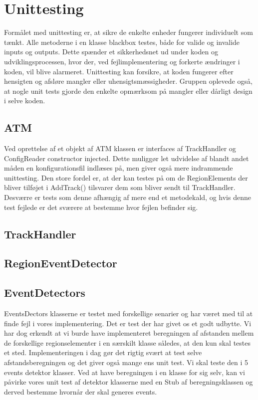 \section{Unittesting}
Formålet med unittesting er, at sikre de enkelte enheder fungerer individuelt som tænkt. Alle metoderne i en klasse blackbox testes, både for valide og invalide inputs og outputs. Dette spænder et sikkerhedsnet ud under koden og udviklingsprocessen, hvor der, ved fejlimplementering og forkerte ændringer i koden, vil blive alarmeret. Unittesting kan forsikre, at koden fungerer efter hensigten og afsløre mangler eller uhensigtsmæssigheder. Gruppen oplevede også, at nogle unit tests gjorde den enkelte opmærksom på mangler eller dårligt design i selve koden.

\subsection{ATM}
Ved oprettelse af et objekt af ATM klassen er interfaces af TrackHandler og ConfigReader constructor injected. Dette muliggør let udvidelse af blandt andet måden en konfigurationsfil indlæses på, men giver også mere indrammende unittesting. Den store fordel er, at der kan testes på om de RegionElements der bliver tilføjet i AddTrack() tilsvarer dem som bliver sendt til TrackHandler. Desværre er tests som denne afhængig af mere end et metodekald, og hvis denne test fejlede er det sværere at bestemme hvor fejlen befinder sig.

\subsection{TrackHandler}

\subsection{RegionEventDetector}
\subsection{EventDetectors}
EventsDectors klasserne er testet med forskellige senarier og har været med til at finde fejl i vores implementering. Det er test der har givet os et godt udbytte. Vi har dog erkendt at vi burde have implementeret beregningen af afstanden mellem de forskellige regionselementer i en særskilt klasse således, at den kun skal testes et sted. Implementeringen i dag gør det rigtig svært at test selve afstandsberegningen og det giver også mange ens unit test. Vi skal teste den i 5 events detektor klasser. Ved at have beregningen i en klasse for sig selv, kan vi påvirke vores unit test af detektor klasserne med en Stub af beregningsklassen og derved bestemme hvornår der skal generes events.

